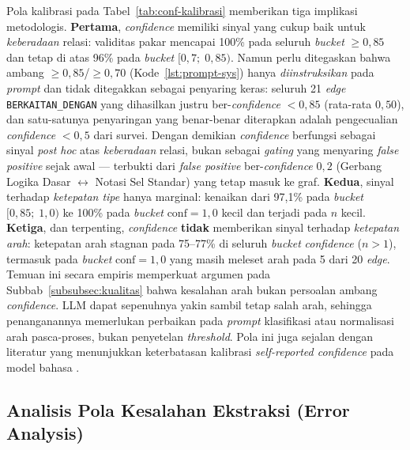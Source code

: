 \documentclass[../../thesis]{subfiles}
\begin{document}
Pola kalibrasi pada Tabel~\ref{tab:conf-kalibrasi} memberikan tiga
implikasi metodologis. \textbf{Pertama}, \textit{confidence}
memiliki sinyal yang cukup baik untuk \textit{keberadaan} relasi:
validitas pakar mencapai 100\% pada seluruh \textit{bucket}
$\geq 0{,}85$ dan tetap di atas 96\% pada \textit{bucket}
$[0{,}7;\;0{,}85)$. Namun perlu ditegaskan bahwa ambang
$\geq 0{,}85$/$\geq 0{,}70$ (Kode~\ref{lst:prompt-sys}) hanya
\emph{diinstruksikan} pada \textit{prompt} dan tidak ditegakkan sebagai
penyaring keras: seluruh 21 \textit{edge} \texttt{BERKAITAN\_DENGAN} yang
dihasilkan justru ber-\textit{confidence} $< 0{,}85$ (rata-rata $0{,}50$),
dan satu-satunya penyaringan yang benar-benar diterapkan adalah pengecualian
\textit{confidence} $< 0{,}5$ dari survei. Dengan demikian \textit{confidence}
berfungsi sebagai sinyal \textit{post hoc} atas \textit{keberadaan} relasi,
bukan sebagai \textit{gating} yang menyaring \textit{false positive} sejak
awal --- terbukti dari \textit{false positive} ber-\textit{confidence} $0{,}2$
(Gerbang Logika Dasar $\leftrightarrow$ Notasi Sel Standar) yang tetap masuk
ke graf. \textbf{Kedua}, sinyal terhadap
\textit{ketepatan tipe} hanya marginal: kenaikan dari 97{,}1\%
pada \textit{bucket} $[0{,}85;\;1{,}0)$ ke 100\% pada
\textit{bucket} $\text{conf}=1{,}0$ kecil dan terjadi pada $n$ kecil.
\textbf{Ketiga}, dan terpenting, \textit{confidence} \textbf{tidak}
memberikan sinyal terhadap \textit{ketepatan arah}: ketepatan
arah stagnan pada 75--77\% di seluruh \textit{bucket}
\textit{confidence} ($n > 1$), termasuk pada \textit{bucket}
$\text{conf} = 1{,}0$ yang masih meleset arah pada 5 dari 20
\textit{edge}. Temuan ini secara empiris memperkuat argumen pada
Subbab~\ref{subsubsec:kualitas} bahwa kesalahan arah bukan
persoalan ambang \textit{confidence}. LLM dapat sepenuhnya yakin
sambil tetap salah arah, sehingga penanganannya memerlukan
perbaikan pada \textit{prompt} klasifikasi atau normalisasi arah
pasca-proses, bukan penyetelan \textit{threshold}. Pola ini juga
sejalan dengan literatur yang menunjukkan keterbatasan kalibrasi
\textit{self-reported confidence} pada model bahasa
\parencite{kadavath_language_2022}.

\subsection{Analisis Pola Kesalahan Ekstraksi (Error Analysis)}\label{subsubsec:error-analysis}
\end{document}
